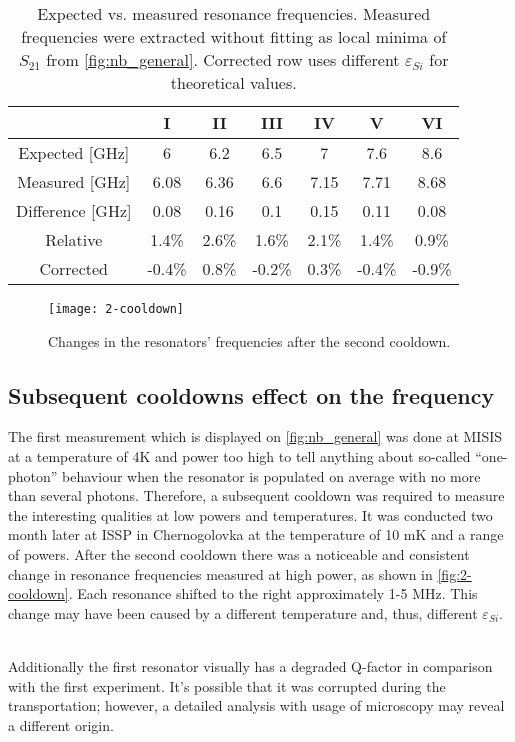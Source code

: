 \documentclass[12pt]{article}
\numberwithin{equation}{section}
\begin{document}
\begin{table}
\centering
\bgroup
\def\arraystretch{1.5}%
\begin{tabular}{c|*{6}{c}}
  & I & II & III & IV & V & VI\\
\hline
Expected [GHz]& 6 & 6.2 & 6.5 & 7 & 7.6 & 8.6 \\
Measured [GHz] & 6.08 &  6.36 &  6.6  &  7.15 &  7.71 &  8.68 \\
Difference [GHz]&  0.08 &  0.16 &  0.1  &  0.15 &  0.11 &  0.08 \\
Relative & 1.4\% &  2.6\% &  1.6\% &  2.1\% &  1.4\% &  0.9\% \\
Corrected & -0.4\% &  0.8\% & -0.2\% &  0.3\% & -0.4\% & -0.9\%
\end{tabular}
\egroup
\caption{Expected vs. measured resonance frequencies. Measured frequencies were extracted without fitting as local minima of $S_{21}$ from \autoref{fig:nb_general}. Corrected row uses different $\varepsilon_{Si}$ for theoretical values.}
\label{tab:freqs_nb}
\end{table}

\begin{figure}[h]
\centering
\texttt{[image: 2-cooldown]}
\caption{Changes in the resonators' frequencies after the second cooldown.}
\label{fig:2-cooldown}
\end{figure}

\subsection{Subsequent cooldowns effect on the frequency}

The first measurement which is displayed on \autoref{fig:nb_general} was done at MISIS at a temperature  of 4K and power too high to tell anything about so-called ``one-photon'' behaviour when the resonator is populated on average with no more than several photons. Therefore, a subsequent cooldown was required to measure the interesting qualities at low powers and temperatures. It was conducted two month later at ISSP in Chernogolovka at the temperature of 10 mK and a range of powers. After the second cooldown there was a noticeable and consistent change in resonance frequencies measured at high power, as shown in \autoref{fig:2-cooldown}. Each resonance shifted to the right approximately 1-5 MHz. This change may have been caused by a different temperature and, thus, different $\varepsilon_{Si}$. \

Additionally the first resonator visually has a degraded Q-factor in comparison with the first experiment. It's possible that it was corrupted during the transportation; however, a detailed analysis with usage of microscopy may reveal a different origin.
\end{document}

